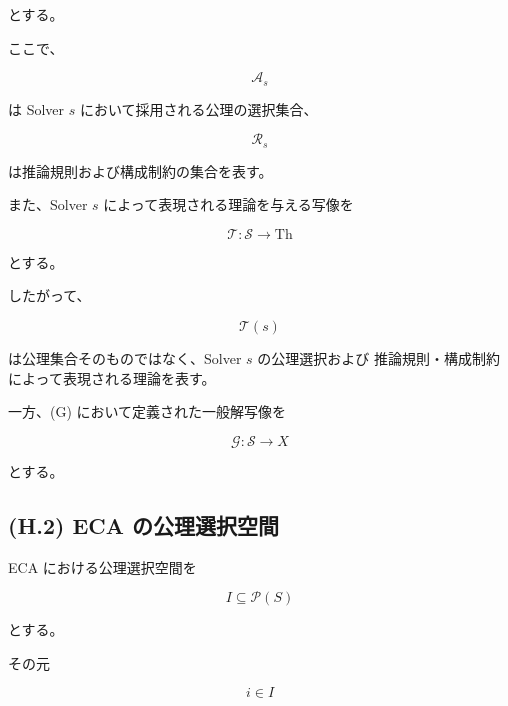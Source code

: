 \documentclass[a4paper,11pt]{article}
\begin{document}
とする。

ここで、

\begin{equation}
    \mathcal{A}_s
\end{equation}

は Solver $s$ において採用される公理の選択集合、

\begin{equation}
    \mathcal{R}_s
\end{equation}

は推論規則および構成制約の集合を表す。

また、Solver $s$ によって表現される理論を与える写像を

\begin{equation}
    \mathcal{T}:
    \mathcal{S}
    \longrightarrow
    \mathrm{Th}
    \label{eq:H-theory-map}
\end{equation}

とする。

したがって、

\begin{equation}
    \mathcal{T}(s)
\end{equation}

は公理集合そのものではなく、Solver $s$ の公理選択および
推論規則・構成制約によって表現される理論を表す。

一方、(G) において定義された一般解写像を

\begin{equation}
    \boxed{
        \mathcal{G}:
        \mathcal{S}
        \longrightarrow
        X
    }
    \label{eq:H-general-solution}
\end{equation}

とする。


\subsection{(H.2) ECA の公理選択空間}
\label{subsec:H2}

ECA における公理選択空間を

\begin{equation}
    I
    \subseteq
    \mathcal{P}(S)
    \label{eq:H-axiom-space}
\end{equation}

とする。

その元

\begin{equation}
    i\in I
\end{equation}
\end{document}

